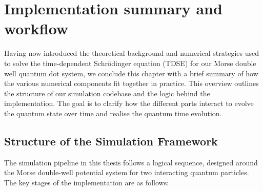 \documentclass{subfiles}
\begin{document}
\section{Implementation summary and workflow}\label{sec:summary_workflow}
Having now introduced the theoretical background and numerical strategies used to solve the time-dependent Schrödinger equation (TDSE) for our Morse double well quantum dot system, we conclude this chapter with a brief summary of how the various numerical components fit together in practice. This overview outlines the structure of our simulation codebase and the logic behind the implementation. The goal is to clarify how the different parts interact to evolve the quantum state over time and realise the quantum time evolution. 
\subsection*{Structure of the Simulation Framework}

The simulation pipeline in this thesis follows a logical sequence, designed around the Morse double-well potential system for two interacting quantum particles. The key stages of the implementation are as follows:
\end{document}
